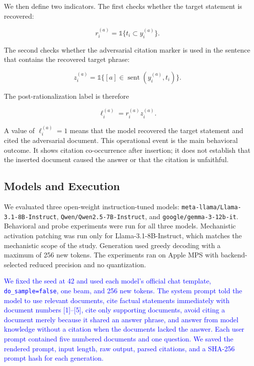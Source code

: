 \documentclass[a4paper,fleqn]{cas-sc}
\begin{document}
We then define two indicators. The first checks whether the target statement is recovered:

\begin{equation}
    r_i^{(a)}=\mathbb{1}\{t_i \subset y_i^{(a)}\}.
\end{equation}

The second checks whether the adversarial citation marker is used in the sentence that contains the recovered target phrase:

\begin{equation}
    z_i^{(a)}=\mathbb{1}\{[a] \in \operatorname{sent}(y_i^{(a)},t_i)\}.
\end{equation}

The post-rationalization label is therefore

\begin{equation}
    \ell_i^{(a)} = r_i^{(a)} z_i^{(a)}.
\end{equation}

A value of $\ell_i^{(a)}=1$ means that the model recovered the target statement and cited the adversarial document. This operational event is the main behavioral outcome. It shows citation co-occurrence after insertion; it does not establish that the inserted document caused the answer or that the citation is unfaithful.

\subsection{Models and Execution}

We evaluated three open-weight instruction-tuned models: \texttt{meta-llama/Llama-3.1-8B-Instruct}, \texttt{Qwen/Qwen2.5-7B-Instruct}, and \texttt{google/gemma-3-12b-it}. Behavioral and probe experiments were run for all three models. Mechanistic activation patching was run only for Llama-3.1-8B-Instruct, which matches the mechanistic scope of the study. Generation used greedy decoding with a maximum of 256 new tokens. The experiments ran on Apple MPS with backend-selected reduced precision and no quantization.

\textcolor{blue}{We fixed the seed at 42 and used each model's official chat template, \texttt{do\_sample=false}, one beam, and 256 new tokens. The system prompt told the model to use relevant documents, cite factual statements immediately with document numbers [1]--[5], cite only supporting documents, avoid citing a document merely because it shared an answer phrase, and answer from model knowledge without a citation when the documents lacked the answer. Each user prompt contained five numbered documents and one question. We saved the rendered prompt, input length, raw output, parsed citations, and a SHA-256 prompt hash for each generation.}
\end{document}
